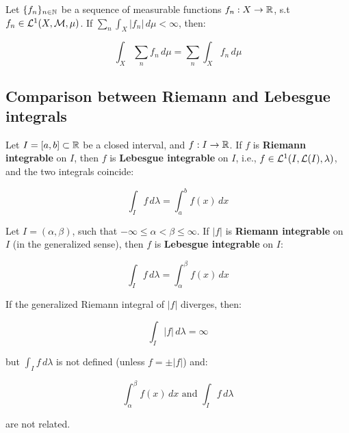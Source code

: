 \begin{fcorollary}
    Let $\{f_n\}_{n \in \mathbb{N}}$ be a sequence of measurable functions $f_n: X \to \mathbb{R}$,
    s.t $f_n \in \mathcal{L}^1(X, \mathcal{M}, \mu)$. If $\sum_{n} \int_{X} |f_n| \, d\mu < \infty$,
    then:
    
    $$\int_{X} \sum_{n} f_n \, d\mu = \sum_{n} \int_{X} f_n \, d\mu$$
\end{fcorollary}

\subsection{Comparison between Riemann and Lebesgue integrals}

\begin{ftheorem}
    Let $I = [a, b] \subset \mathbb{R}$ be a closed interval, and $f: I \to \mathbb{R}$.
    If $f$ is \textbf{Riemann integrable} on $I$, then $f$ is \textbf{Lebesgue integrable} on $I$,
    i.e., $f \in \mathcal{L}^1(I, \mathcal{L}(I), \lambda)$, and the two integrals coincide:

    $$\int_{I} f \, d\lambda = \int_{a}^{b} f(x) \, dx$$

\end{ftheorem}

\vspace{1em}

\begin{ftheorem}
    Let $I = (\alpha, \beta)$, such that $-\infty \leq \alpha < \beta \leq \infty$.
    If $|f|$ is \textbf{Riemann integrable} on $I$ (in the generalized sense), 
    then $f$ is \textbf{Lebesgue integrable} on $I$:

    $$\int_{I} f \, d\lambda = \int_{\alpha}^{\beta} f(x) \, dx$$
\end{ftheorem}

\begin{fremark}
    If the generalized Riemann integral of $|f|$ diverges, then:

    $$\int_{I} |f| \, d\lambda = \infty$$

    but $\int_{I} f \, d\lambda$ is not defined (unless $f = \pm |f|$)
    and:

    $$\int_{\alpha}^{\beta} f(x) \, dx \text{ and } \int_{I} f \, d\lambda$$

    are not related.
\end{fremark}
